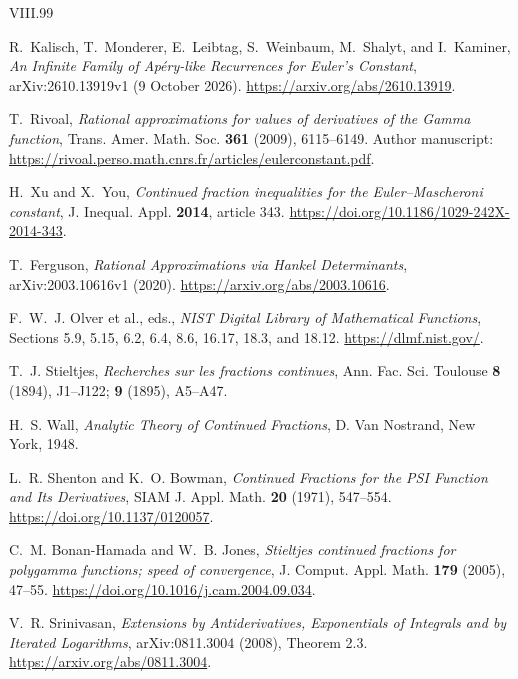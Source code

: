 \documentclass[11pt,a4paper]{article}
\theoremstyle{definition}
\theoremstyle{remark}
\numberwithin{equation}{section}
\begin{document}
\begin{thebibliography}{VIII.99}

R.~Kalisch, T.~Monderer, E.~Leibtag, S.~Weinbaum, M.~Shalyt, and I.~Kaminer,
\emph{An Infinite Family of Ap\'ery-like Recurrences for Euler's Constant},
arXiv:2610.13919v1 (9 October 2026).
\url{https://arxiv.org/abs/2610.13919}.

T.~Rivoal, \emph{Rational approximations for values of derivatives of the
Gamma function}, Trans. Amer. Math. Soc. \textbf{361} (2009), 6115--6149.
Author manuscript: \url{https://rivoal.perso.math.cnrs.fr/articles/eulerconstant.pdf}.

H.~Xu and X.~You, \emph{Continued fraction inequalities for the
Euler--Mascheroni constant}, J. Inequal. Appl. \textbf{2014}, article 343.
\url{https://doi.org/10.1186/1029-242X-2014-343}.

T.~Ferguson, \emph{Rational Approximations via Hankel Determinants},
arXiv:2003.10616v1 (2020).
\url{https://arxiv.org/abs/2003.10616}.

F.~W.~J. Olver et al., eds., \emph{NIST Digital Library of Mathematical
Functions}, Sections 5.9, 5.15, 6.2, 6.4, 8.6, 16.17, 18.3, and 18.12.
\url{https://dlmf.nist.gov/}.

T.~J. Stieltjes, \emph{Recherches sur les fractions continues},
Ann. Fac. Sci. Toulouse \textbf{8} (1894), J1--J122;
\textbf{9} (1895), A5--A47.

H.~S. Wall, \emph{Analytic Theory of Continued Fractions},
D. Van Nostrand, New York, 1948.

L.~R. Shenton and K.~O. Bowman, \emph{Continued Fractions for the PSI
Function and Its Derivatives}, SIAM J. Appl. Math. \textbf{20} (1971), 547--554.
\url{https://doi.org/10.1137/0120057}.

C.~M. Bonan-Hamada and W.~B. Jones, \emph{Stieltjes continued fractions
for polygamma functions; speed of convergence},
J. Comput. Appl. Math. \textbf{179} (2005), 47--55.
\url{https://doi.org/10.1016/j.cam.2004.09.034}.

V.~R. Srinivasan, \emph{Extensions by Antiderivatives, Exponentials of
Integrals and by Iterated Logarithms}, arXiv:0811.3004 (2008),
Theorem 2.3.
\url{https://arxiv.org/abs/0811.3004}.


\end{thebibliography}
\end{document}
